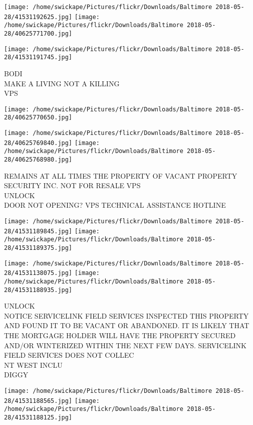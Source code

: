 \documentclass[10pt,letterpaper]{article}
\begin{document}
\texttt{[image: /home/swickape/Pictures/flickr/Downloads/Baltimore 2018-05-28/41531192625.jpg]}
\texttt{[image: /home/swickape/Pictures/flickr/Downloads/Baltimore 2018-05-28/40625771700.jpg]}

\texttt{[image: /home/swickape/Pictures/flickr/Downloads/Baltimore 2018-05-28/41531191745.jpg]}

BODI\\
MAKE A LIVING NOT A KILLING\\
VPS
\pagebreak

\texttt{[image: /home/swickape/Pictures/flickr/Downloads/Baltimore 2018-05-28/40625770650.jpg]}

\vspace{0.25in}
\texttt{[image: /home/swickape/Pictures/flickr/Downloads/Baltimore 2018-05-28/40625769840.jpg]}
\texttt{[image: /home/swickape/Pictures/flickr/Downloads/Baltimore 2018-05-28/40625768980.jpg]}

REMAINS AT ALL TIMES THE PROPERTY OF VACANT PROPERTY SECURITY INC. NOT FOR RESALE VPS\\
UNLOCK\\
DOOR NOT OPENING?  VPS TECHNICAL ASSISTANCE HOTLINE
\pagebreak

\texttt{[image: /home/swickape/Pictures/flickr/Downloads/Baltimore 2018-05-28/41531189845.jpg]}
\texttt{[image: /home/swickape/Pictures/flickr/Downloads/Baltimore 2018-05-28/41531189375.jpg]}

\texttt{[image: /home/swickape/Pictures/flickr/Downloads/Baltimore 2018-05-28/41531138075.jpg]}
\texttt{[image: /home/swickape/Pictures/flickr/Downloads/Baltimore 2018-05-28/41531188935.jpg]}

UNLOCK\\
NOTICE SERVICELINK FIELD SERVICES INSPECTED THIS PROPERTY AND FOUND IT TO BE VACANT OR ABANDONED.  IT IS LIKELY THAT THE MORTGAGE HOLDER WILL HAVE THE PROPERTY SECURED AND/OR WINTERIZED WITHIN THE NEXT FEW DAYS.  SERVICELINK FIELD SERVICES DOES NOT COLLEC\\
NT WEST INCLU\\
DIGGY
\pagebreak

\texttt{[image: /home/swickape/Pictures/flickr/Downloads/Baltimore 2018-05-28/41531188565.jpg]}
\texttt{[image: /home/swickape/Pictures/flickr/Downloads/Baltimore 2018-05-28/41531188125.jpg]}
\end{document}

